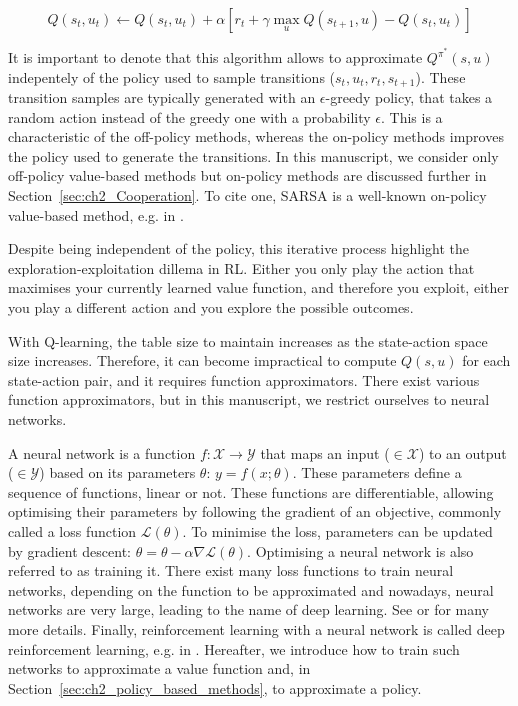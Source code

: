 \begin{equation}
\label{eq:ch2_QLearning}
    Q(s_t, u_t) \leftarrow Q(s_t, u_t) + \alpha \left[ r_t + \gamma \max_u Q(s_{t+1}, u) - Q(s_t, u_t) \right]
\end{equation}

It is important to denote that this algorithm allows to approximate $Q^{\pi^*}(s, u)$ indepentely of the policy used to sample transitions ($s_t, u_t, r_t, s_{t+1}$).
These transition samples are typically generated with an $\epsilon$-greedy policy, that takes a random action instead of the greedy one with a probability $\epsilon$.
This is a characteristic of the off-policy methods, whereas the on-policy methods improves the policy used to generate the transitions.
In this manuscript, we consider only off-policy value-based methods but on-policy methods are discussed further in Section~\ref{sec:ch2_Cooperation}.
To cite one, SARSA is a well-known on-policy value-based method, e.g. in \citep{sutton2018reinforcement}.

Despite being independent of the policy, this iterative process highlight the exploration-exploitation dillema in RL.
Either you only play the action that maximises your currently learned value function, and therefore you exploit, either you play a different action and you explore the possible outcomes.

With Q-learning, the table size to maintain increases as the state-action space size increases.
Therefore, it can become impractical to compute $Q(s, u)$ for each state-action pair, and it requires function approximators.
There exist various function approximators, but in this manuscript, we restrict ourselves to neural networks.

A neural network is a function $f: \mathcal{X} \rightarrow \mathcal{Y}$ that maps an input ($\in\mathcal{X}$) to an output ($\in\mathcal{Y}$) based on its parameters $\theta$: $y = f(x;\theta)$.
These parameters define a sequence of functions, linear or not.
These functions are differentiable, allowing optimising their parameters by following the gradient of an objective, commonly called a loss function $\mathcal{L}(\theta)$.
To minimise the loss, parameters can be updated by gradient descent: $\theta = \theta - \alpha \nabla \mathcal{L}(\theta)$.
Optimising a neural network is also referred to as training it.
There exist many loss functions to train neural networks, depending on the function to be approximated and nowadays, neural networks are very large, leading to the name of deep learning.
See \citep{zhang2023dive} or \citep{pml1Book} for many more details.
Finally, reinforcement learning with a neural network is called deep reinforcement learning, e.g. in \citep{introDeepRL}.
Hereafter, we introduce how to train such networks to approximate a value function and, in Section~\ref{sec:ch2_policy_based_methods}, to approximate a policy.

